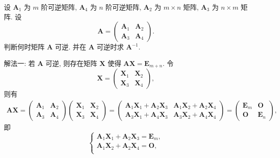 \documentclass[../../main.tex]{subfiles}
\begin{document}
\begin{example}
设 \(\boldsymbol{A}_1\) 为 \(m\) 阶可逆矩阵, \(\boldsymbol{A}_4\) 为 \(n\) 阶可逆矩阵, \(\boldsymbol{A}_2\) 为 \(m \times n\) 矩阵, \(\boldsymbol{A}_3\) 为 \(n \times m\) 矩阵. 设
\[
\boldsymbol{A} = \begin{pmatrix} \boldsymbol{A}_1 & \boldsymbol{A}_2 \\ \boldsymbol{A}_3 & \boldsymbol{A}_4 \end{pmatrix}.
\]
判断何时矩阵 \(\boldsymbol{A}\) 可逆. 并在 \(\boldsymbol{A}\) 可逆时求 \(\boldsymbol{A}^{-1}\).
\end{example}
\begin{solution}
{\color{blue}解法一:}
若 \(\boldsymbol{A}\) 可逆, 则存在矩阵 \(\boldsymbol{X}\) 使得 \(\boldsymbol{A}\boldsymbol{X} = \boldsymbol{E}_{m + n}\). 令
\[
\boldsymbol{X} = \begin{pmatrix} \boldsymbol{X}_1 & \boldsymbol{X}_2 \\ \boldsymbol{X}_3 & \boldsymbol{X}_4 \end{pmatrix},
\]
则有
\[
\begin{aligned}
\boldsymbol{A}\boldsymbol{X} = \begin{pmatrix} \boldsymbol{A}_1 & \boldsymbol{A}_2 \\ \boldsymbol{A}_3 & \boldsymbol{A}_4 \end{pmatrix} \begin{pmatrix} \boldsymbol{X}_1 & \boldsymbol{X}_2 \\ \boldsymbol{X}_3 & \boldsymbol{X}_4 \end{pmatrix} = \begin{pmatrix} \boldsymbol{A}_1\boldsymbol{X}_1 + \boldsymbol{A}_2\boldsymbol{X}_3 & \boldsymbol{A}_1\boldsymbol{X}_2 + \boldsymbol{A}_2\boldsymbol{X}_4 \\ \boldsymbol{A}_3\boldsymbol{X}_1 + \boldsymbol{A}_4\boldsymbol{X}_3 & \boldsymbol{A}_3\boldsymbol{X}_2 + \boldsymbol{A}_4\boldsymbol{X}_4 \end{pmatrix} = \begin{pmatrix} \boldsymbol{E}_m & \boldsymbol{O} \\ \boldsymbol{O} & \boldsymbol{E}_n \end{pmatrix},
\end{aligned}
\]
即
\[
\begin{cases}
\boldsymbol{A}_1\boldsymbol{X}_1 + \boldsymbol{A}_2\boldsymbol{X}_3 = \boldsymbol{E}_m, \\
\boldsymbol{A}_1\boldsymbol{X}_2 + \boldsymbol{A}_2\boldsymbol{X}_4 = \boldsymbol{O}, \\

\end{cases}\]
\end{solution}
\end{document}

